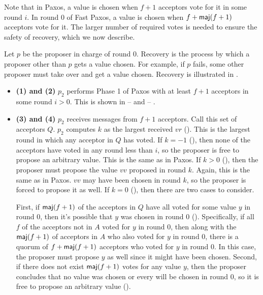Note that in Paxos, a value is chosen when $f+1$ acceptors vote for it in some
round $i$. In round $0$ of Fast Paxos, a value is chosen when $f + \textsf{maj}(f+1)$
acceptors vote for it. The larger number of required votes is needed to ensure
the safety of recovery, which we now describe.

Let $p$ be the proposer in charge of round $0$. Recovery is the process by
which a proposer other than $p$ gets a value chosen. For example, if $p$ fails,
some other proposer must take over and get a value chosen. Recovery is
illustrated in .

\begin{itemize}
  \item \textbf{(1) and (2)}
    $p_2$ performs Phase 1 of Paxos with at least $f+1$ acceptors in some round
    $i > 0$. This is shown in 
     --  and
      --
    .

  \item \textbf{(3) and (4)}
    $p_2$ receives  messages from $f+1$ acceptors. Call
    this set of acceptors $Q$. $p_2$ computes $k$ as the largest received $vr$
    (). This is the largest round in which any acceptor in
    $Q$ has voted. If $k = -1$ (), then none of the acceptors have
    voted in any round less than $i$, so the proposer is free to propose an
    arbitrary value. This is the same as in Paxos. If $k > 0$ (),
    then the proposer must propose the value $vv$ proposed in round $k$. Again,
    this is the same as in Paxos. $vv$ may have been chosen in round $k$, so
    the proposer is forced to propose it as well. If $k = 0$ (),
    then there are two cases to consider.

    First, if $\textsf{maj}(f+1)$ of the acceptors in $Q$ have all voted for some value
    $y$ in round $0$, then it's possible that $y$ was chosen in round $0$
    ().  Specifically, if all $f$ of the acceptors not in $A$
    voted for $y$ in round $0$, then along with the $\textsf{maj}(f+1)$ of acceptors in
    $A$ who also voted for $y$ in round $0$, there is a quorum of $f +
    \textsf{maj}(f+1)$ acceptors who voted for $y$ in round $0$. In this case, the
    proposer must propose $y$ as well since it might have been chosen. Second,
    if there does not exist $\textsf{maj}(f+1)$ votes for any value $y$, then the
    proposer concludes that no value was chosen or every will be chosen in
    round $0$, so it is free to propose an arbitrary value
    ().


\end{itemize}
